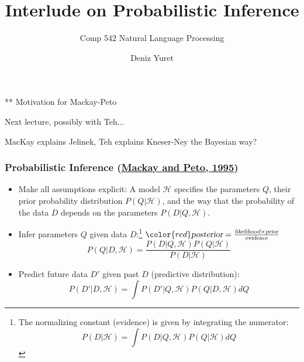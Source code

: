 \documentclass[ignorenonframetext]{beamer}
\title{Interlude on Probabilistic Inference}
\subtitle{Comp 542 Natural Language Processing}
\author{Deniz Yuret}
\begin{document}
\begin{frame}
\maketitle
\end{frame}

** Motivation for Mackay-Peto

Next lecture, possibly with Teh...

MacKay explains Jelinek, Teh explains Kneser-Ney the Bayesian way?

\begin{frame}\frametitle{Probabilistic Inference (\href{http://www2.denizyuret.com/ref/mackay/lang4.pdf}{Mackay and Peto, 1995})}
\begin{itemize}
\item Make all assumptions explicit: A model $\mathcal{H}$ specifies
  the parameters $Q$, their prior probability distribution
  $P(Q|\mathcal{H})$, and the way that the probability of the data $D$
  depends on the parameters $P(D|Q,\mathcal{H})$.
\item Infer parameters $Q$ given data $D$:\footnote{The normalizing constant (evidence) is given by integrating the
numerator:\[ P(D|\mathcal{H}) = \int P(D|Q,\mathcal{H})
P(Q|\mathcal{H}) dQ
\]
}
$\color{red}\textsl{posterior}=\frac{\textsl{likelihood}\times
  \textsl{prior}}{\textsl{evidence}}$
\[
P(Q|D,\mathcal{H}) = \frac{P(D|Q,\mathcal{H}) P(Q|\mathcal{H})}{P(D|\mathcal{H})}
\]
\item Predict future data $D'$ given past $D$ {\small(predictive distribution)}:
\[
P(D'|D,\mathcal{H}) = \int P(D'|Q,\mathcal{H}) P(Q|D,\mathcal{H}) dQ
\]
\end{itemize}
\end{frame}
\end{document}
